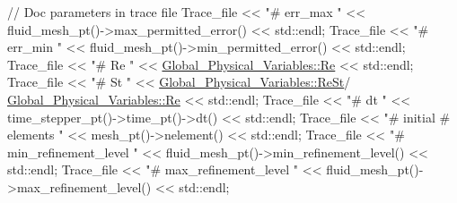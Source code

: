 \begin{DoxyCodeInclude}
{{{{{{{ \textcolor{comment}{// Doc parameters in trace file}
 Trace\_file << \textcolor{stringliteral}{"# err\_max "} << fluid\_mesh\_pt()->max\_permitted\_error() << std::endl;
 Trace\_file << \textcolor{stringliteral}{"# err\_min "} << fluid\_mesh\_pt()->min\_permitted\_error() << std::endl;
 Trace\_file << \textcolor{stringliteral}{"# Re "} << \hyperlink{namespaceGlobal__Physical__Variables_ab814e627d2eb5bc50318879d19ab16b9}{Global\_Physical\_Variables::Re} << std::endl;
 Trace\_file << \textcolor{stringliteral}{"# St "} << \hyperlink{namespaceGlobal__Physical__Variables_a085ee4bf968ffdd01a41b8c41864f907}{Global\_Physical\_Variables::ReSt}/
                          \hyperlink{namespaceGlobal__Physical__Variables_ab814e627d2eb5bc50318879d19ab16b9}{Global\_Physical\_Variables::Re} << std::endl;
 Trace\_file << \textcolor{stringliteral}{"# dt "} << time\_stepper\_pt()->time\_pt()->dt() << std::endl;
 Trace\_file << \textcolor{stringliteral}{"# initial # elements "} << mesh\_pt()->nelement() << std::endl;
 Trace\_file << \textcolor{stringliteral}{"# min\_refinement\_level "} 
            << fluid\_mesh\_pt()->min\_refinement\_level() << std::endl;
 Trace\_file << \textcolor{stringliteral}{"# max\_refinement\_level "} 
            << fluid\_mesh\_pt()->max\_refinement\_level() << std::endl;



}}}}}}}
\end{DoxyCodeInclude}
